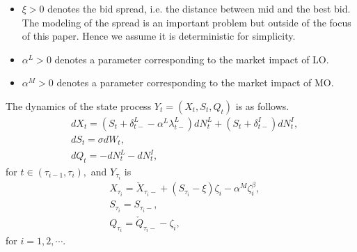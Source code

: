 \documentclass[12pt]{article}
\begin{document}
\begin{itemize}
  $\zeta_i$ is an ${\bf N}$-valued $\mathcal{F}_{\tau_i}$ measurable random variable that denotes the size of MO, i.e. we assume the minimum unit of the trade amount is $1$.
  We formally assume $\tau_0 = 0.$
  \item $\xi>0$ denotes the bid spread, i.e. the distance between mid and the best bid. The modeling of the spread is an important problem but outside of the focus of this paper. Hence we assume it is deterministic for simplicity. 
  \item $\alpha^L>0$ denotes a parameter corresponding to the market impact of LO.
  \item $\alpha^M>0$ denotes a parameter corresponding to the market impact of MO.

\end{itemize}
The dynamics of the state process $Y_t = (X_t, S_t, Q_t)$ is as follows.
\begin{align}
  &dX_t = (S_t + \delta^L_{t-} -\alpha^L\lambda^L_{t-}) dN^{L}_t +(S_t+\delta^I_{t-})dN^{I}_t, \label{eq:dX}\\
  &dS_t = \sigma dW_t, \label{eq:dS}\\
  &dQ_t = -dN_t^{L} -dN^{I}_t, \label{eq:dQ} 
\end{align}
for $t \in (\tau_{i-1}, \tau_i),$ and $Y_{\tau_i}$ is
\begin{align}
  &X_{\tau_i} = \check{X}_{\tau_i-} + (S_{\tau_i}-\xi) \zeta_i -\alpha^M \zeta_i^{\beta}, \label{eq:X}\\
  &S_{\tau_i} = S_{\tau_i-}, \label{eq:S}\\
  &Q_{\tau_i} = \check{Q}_{\tau_i-} -  \zeta_i, \label{eq:Q}
\end{align}
for $i = 1, 2, \cdots.$
\end{document}
